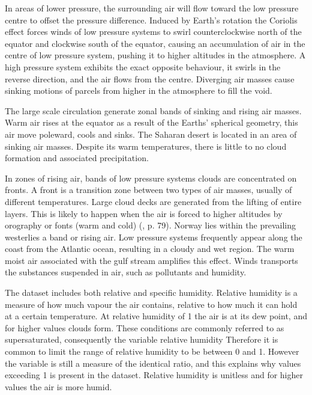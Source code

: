 In areas of lower pressure, the surrounding air will flow toward the low pressure centre to offset the pressure difference. Induced by Earth's rotation the Coriolis effect forces winds of low pressure systems to swirl counterclockwise north of the equator and clockwise south of the equator, causing an accumulation of air in the centre of low pressure system, pushing it to higher altitudes in the atmosphere. A high pressure system exhibits the exact opposite behaviour, it swirls in the reverse direction, and the air flows from the centre. Diverging air masses cause sinking motions of parcels from higher in the atmosphere to fill the void. 

The large scale circulation generate zonal bands of sinking and rising air masses. Warm air rises at the equator as a result of the Earths' spherical geometry, this air move poleward, cools and sinks. The Saharan desert is located in an area of sinking air masses. Despite its warm temperatures, there is little to no cloud formation and associated precipitation. 

In zones of rising air, bands of low pressure systems clouds are concentrated on fronts. A front is a transition zone between two types of air masses, usually of different temperatures. %
Large cloud decks are generated from the lifting of entire layers. This is likely to happen when the air is forced to higher altitudes by orography or fonts (warm and cold) (\cite{lohmann2016}, p. 79). Norway lies within the prevailing westerlies a band or rising air. Low pressure systems frequently appear along the coast from the Atlantic ocean, resulting in a cloudy and wet region. The warm moist air associated with the gulf stream amplifies this effect. Winds transports the substances suspended in air, such as pollutants and humidity. 

The dataset includes both relative and specific humidity. Relative humidity is a measure of how much vapour the air contains, relative to how much it can hold at a certain temperature. At relative humidity of 1 the air is at its dew point, and for higher values clouds form. These conditions are commonly referred to as supersaturated, consequently the variable relative humidity 
Therefore it is common to limit the range of relative humidity to be between 0 and 1. However the variable is still a measure of the identical ratio, and this explains why values exceeding 1 is present in the dataset. Relative humidity is unitless and for higher values the air is more humid.

